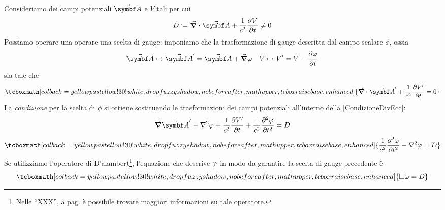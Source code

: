 Consideriamo dei campi potenziali $\vba{A}$ e $V$ tali per cui
\begin{equation*}
	D\coloneqq\div{\vba{A}}+\frac{1}{c^2}\pdv{V}{t}\neq 0
\end{equation*}
Possiamo operare una operare una scelta di gauge: imponiamo che la trasformazione di gauge descritta dal campo scalare $\phi$, ossia
\begin{align*}
	\vba{A}\mapsto\vba{A}'=\vba{A}+\grad{\oldphi}&&
	V\mapsto V'=V-\pdv{\phi}{t}
\end{align*}
sia tale che
\begin{equation}
	\tcboxmath[colback=yellowpastellow!30!white,drop fuzzy shadow, nobeforeafter, math upper, tcbox raise base, enhanced]{\div{\vba{A}'}+\frac{1}{c^2}\pdv{V'}{t}=0}\label{CondizioneDivEcc}
\end{equation}
La \textit{condizione} per la scelta di $\phi$ si ottiene sostituendo le trasformazioni dei campi potenziali all'interno della \eqref{CondizioneDivEcc}:
\begin{equation*}
	\grad{\vba{A}'}-\laplacian{\oldphi}+\frac{1}{c^2}\pdv{V'}{t}+\frac{1}{c^2}\pdv[2]{\oldphi}{t}=D
\end{equation*}
\begin{equation}
	\tcboxmath[colback=yellowpastellow!30!white,drop fuzzy shadow, nobeforeafter, math upper, tcbox raise base, enhanced]{\frac{1}{c^2}\pdv[2]{\phi}{t}-\laplacian{\oldphi}=D}
\end{equation}
Se utilizziamo l'operatore di D'alambert\footnote{Nelle ``XXX'', a pag. \pageref{dalembertiano} è possibile trovare maggiori informazioni su tale operatore.}, l'equazione che descrive $\oldphi$ in modo da garantire la scelta di gauge precedente è
\begin{equation}
	\tcboxmath[colback=yellowpastellow!30!white,drop fuzzy shadow, nobeforeafter, math upper, tcbox raise base, enhanced]{\Box{\oldphi}=D}
\end{equation}
